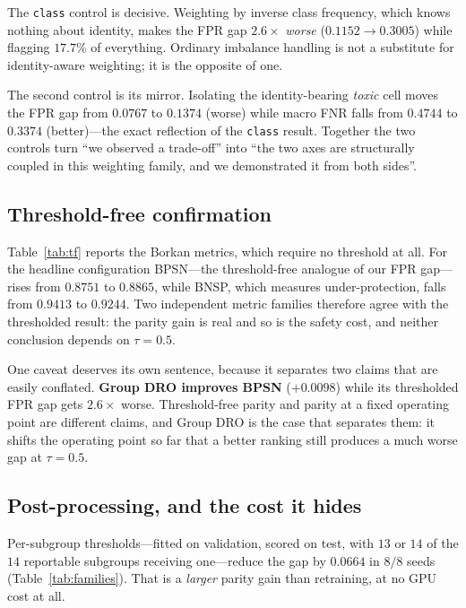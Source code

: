 \documentclass[conference]{IEEEtran}
\begin{document}
The \texttt{class} control is decisive. Weighting by inverse class frequency,
which knows nothing about identity, makes the FPR gap $2.6\times$ \emph{worse}
($0.1152 \rightarrow 0.3005$) while flagging $17.7\%$ of everything. Ordinary
imbalance handling is not a substitute for identity-aware weighting; it is the
opposite of one.

The second control is its mirror. Isolating the identity-bearing \emph{toxic}
cell moves the FPR gap from $0.0767$ to $0.1374$ (worse) while macro FNR falls
from $0.4744$ to $0.3374$ (better)---the exact reflection of the \texttt{class}
result. Together the two controls turn ``we observed a trade-off'' into ``the two
axes are structurally coupled in this weighting family, and we demonstrated it
from both sides''.

\subsection{Threshold-free confirmation}
Table~\ref{tab:tf} reports the Borkan metrics, which require no threshold at all.
For the headline configuration BPSN---the threshold-free analogue of our FPR
gap---rises from $0.8751$ to $0.8865$, while BNSP, which measures
under-protection, falls from $0.9413$ to $0.9244$. Two independent metric
families therefore agree with the thresholded result: the parity gain is real and
so is the safety cost, and neither conclusion depends on $\tau = 0.5$.

\begin{table}[t]
\caption{Threshold-free metrics of Borkan et al.~\cite{borkan2019}, averaged over
each configuration's seeds. BPSN is the threshold-free analogue of the FPR gap;
BNSP measures under-protection.}
\label{tab:tf}
\centering
\small

\end{table}

One caveat deserves its own sentence, because it separates two claims that are
easily conflated. \textbf{Group DRO improves BPSN} ($+0.0098$) while its
thresholded FPR gap gets $2.6\times$ worse. Threshold-free parity and parity at a
fixed operating point are different claims, and Group DRO is the case that
separates them: it shifts the operating point so far that a better ranking still
produces a much worse gap at $\tau = 0.5$.

\subsection{Post-processing, and the cost it hides}
Per-subgroup thresholds---fitted on validation, scored on test, with $13$ or $14$
of the $14$ reportable subgroups receiving one---reduce the gap by $0.0664$ in
$8/8$ seeds (Table~\ref{tab:families}). That is a \emph{larger} parity gain than
retraining, at no GPU cost at all.
\end{document}
